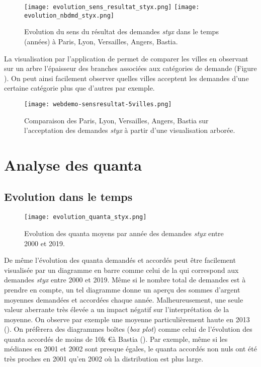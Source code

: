 \begin{figure}%
	\centering 
	\texttt{[image: evolution\_sens\_resultat\_styx.png]}
	\texttt{[image: evolution\_nbdmd\_styx.png]}
	\caption{Evolution du sens du résultat des demandes \textit{styx} dans le temps (années) à Paris, Lyon, Versailles, Angers, Bastia.}\label{fig:demo:analyse-sens-resultat-styx}
\end{figure}

La visualisation par l'application de \citet{PRYSIAZHNIUK2017jurisprudence-demo-web} permet de comparer les villes en observant sur un arbre l'épaisseur des branches associées aux catégories de demande (Figure ). On peut ainsi facilement observer quelles villes acceptent les demandes d'une certaine catégorie plus que d'autres par exemple.


\begin{figure}[!htb]
	\centering 
	\texttt{[image: webdemo-sensresultat-5villes.png]}
	\caption{Comparaison des Paris, Lyon, Versailles, Angers, Bastia sur l'acceptation des demandes \textit{styx} à partir d'une visualisation arborée.}\label{fig:demo:web-styx}
\end{figure}

\section{Analyse des quanta}
\subsection{Evolution dans le temps}
\begin{figure}[!htb]
	\centering 
	\texttt{[image: evolution\_quanta\_styx.png]}
	\caption{Evolution des quanta moyens par année des demandes \textit{styx} entre  2000  et 2019.}\label{fig:demo:evolution-quanta-styx}
\end{figure}

De même l'évolution des quanta demandés et accordés peut être facilement visualisée par un diagramme en barre comme celui de la  qui correspond aux demandes \textit{styx} entre 2000  et 2019. Même si le nombre total de demandes est à prendre en compte, un tel diagramme donne un aperçu des sommes d'argent moyennes demandées et accordées chaque année. Malheureusement, une seule valeur aberrante très élevée a un impact négatif sur l'interprétation de la moyenne. On observe par exemple une moyenne particulièrement haute en 2013  (). On préfèrera des diagrammes boîtes (\textit{box plot}) comme celui de l'évolution des quanta accordés de moins de 10k \euro à Bastia (). Par exemple, même si les médianes en 2001 et 2002 sont presque égales, le quanta accordés non nuls ont été très proches en 2001 qu'en 2002 où la distribution est plus large.

